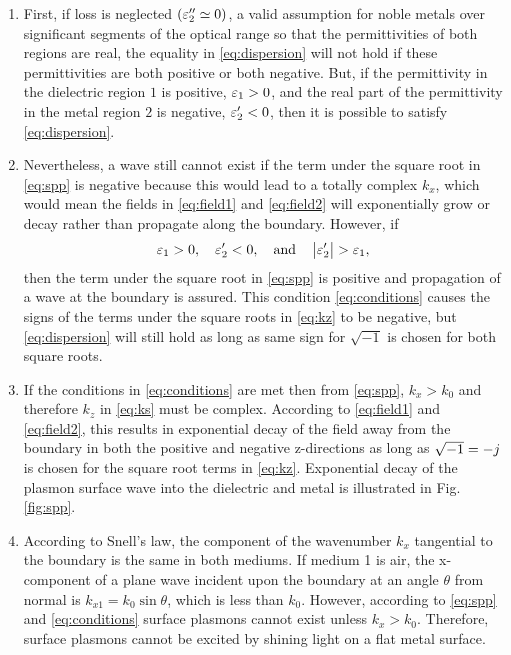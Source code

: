 \begin{enumerate}
  \item First, if loss is neglected $(\varepsilon_2'' \simeq 0)$, a valid assumption for noble metals over significant segments of the optical range so that the permittivities of both regions are real, the equality in \eqref{eq:dispersion} will not hold if these permittivities are both positive or both negative. But, if the permittivity in the dielectric region $1$ is positive, $\varepsilon_1 > 0$, and the real part of the permittivity in the metal region $2$ is negative, $\varepsilon_2' < 0$, then it is possible to satisfy \eqref{eq:dispersion}.
  \item	Nevertheless, a wave still cannot exist if the term under the square root in \eqref{eq:spp} is negative because this would lead to a totally complex $k_x$, which would mean the fields in \eqref{eq:field1} and \eqref{eq:field2} will exponentially grow or decay rather than propagate along the boundary. However, if
  \begin{equation}
    \varepsilon_1 > 0, \quad		 \varepsilon_2' < 0, \quad   \text{and}  \quad \left| \varepsilon_2' \right| > \varepsilon_1,
    \label{eq:conditions}
  \end{equation}
  then the term under the square root in \eqref{eq:spp} is positive and propagation of a wave at the boundary is assured. This condition \eqref{eq:conditions} causes the signs of the terms under the square roots in \eqref{eq:kz} to be negative, but \eqref{eq:dispersion} will still hold as long as same sign for $\sqrt{-1}$ is chosen for both square roots.
  \item	If the conditions in \eqref{eq:conditions} are met then from \eqref{eq:spp}, $k_x > k_0$ and therefore $k_z$ in \eqref{eq:ks} must be complex. According to \eqref{eq:field1} and \eqref{eq:field2}, this results in exponential decay of the field away from the boundary in both the positive and negative z-directions as long as $\sqrt{-1} = -j\mkern1mu$ is chosen for the square root terms in \eqref{eq:kz}. Exponential decay of the plasmon surface wave into the dielectric and metal is illustrated in Fig. \ref{fig:spp}.
  \item	According to Snell's law, the component of the wavenumber $k_x$ tangential to the boundary is the same in both mediums. If medium 1 is air, the x-component of a plane wave incident upon the boundary at an angle $\theta$ from normal is $k_{x1} = k_0 \sin \theta$, which is less than $k_0$. However, according to \eqref{eq:spp} and \eqref{eq:conditions} surface plasmons cannot exist unless $k_x > k_0$. Therefore, surface plasmons cannot be excited by shining light on a flat metal surface.

\end{enumerate}
